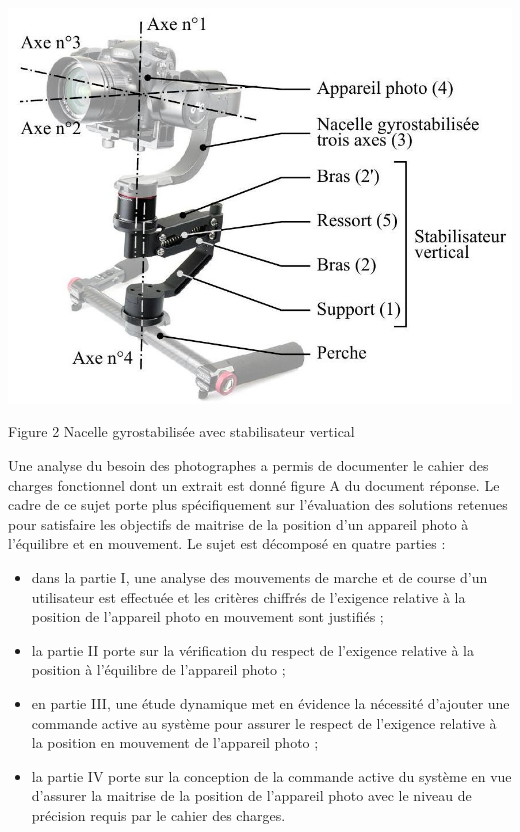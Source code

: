 \documentclass[10pt]{article}
\begin{document}
\begin{center}
\includegraphics[max width=\textwidth]{2022_12_31_ed674c1a831ea1bff3a0g-01(2)}
\end{center}

Figure 2 Nacelle gyrostabilisée avec stabilisateur vertical

Une analyse du besoin des photographes a permis de documenter le cahier des charges fonctionnel dont un extrait est donné figure A du document réponse. Le cadre de ce sujet porte plus spécifiquement sur l'évaluation des solutions retenues pour satisfaire les objectifs de maitrise de la position d'un appareil photo à l'équilibre et en mouvement. Le sujet est décomposé en quatre parties :

\begin{itemize}
  \item dans la partie I, une analyse des mouvements de marche et de course d'un utilisateur est effectuée et les critères chiffrés de l'exigence relative à la position de l'appareil photo en mouvement sont justifiés ;

  \item la partie II porte sur la vérification du respect de l'exigence relative à la position à l'équilibre de l'appareil photo ;

  \item en partie III, une étude dynamique met en évidence la nécessité d'ajouter une commande active au système pour assurer le respect de l'exigence relative à la position en mouvement de l'appareil photo ;

  \item la partie IV porte sur la conception de la commande active du système en vue d'assurer la maitrise de la position de l'appareil photo avec le niveau de précision requis par le cahier des charges.

\end{itemize}
\end{document}
